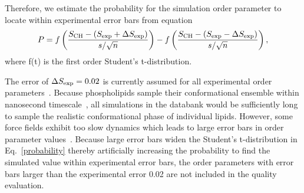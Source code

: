 \documentclass[fleqn,10pt]{wlscirep}
\begin{document}
Therefore, we estimate the probability for the simulation order parameter to locate within experimental error bars from equation
\begin{equation}\label{probability}
  P = f \left( \frac{S_{\rm CH} - (S_{\rm exp}+\Delta S_{\rm exp})}{s/\sqrt{n}} \right) - f \left( \frac{S_{\rm CH} - (S_{\rm exp}-\Delta S_{\rm exp})}{s/\sqrt{n}} \right),
\end{equation}
where f(t) is the first order Student's t-distribution.


The error of $\Delta S_{\rm exp} = 0.02$ is currently assumed for all experimental order parameters~\cite{ollila16}. Because phospholipids sample their conformational ensemble within nanosecond timescale~\cite{ferreira15}, all simulations in the databank would be sufficiently long to sample the realistic conformational phase of individual lipids. However, some force fields exhibit too slow dynamics which leads to large error bars in order parameter values~\cite{antila21a}. Because large error bars widen the Student's t-distribution in Eq.~\ref{probability} thereby artificially increasing the probability to find the simulated value within experimental error bars, the order parameters with error bars larger than the experimental error 0.02 are not included in the quality evaluation.
\end{document}
